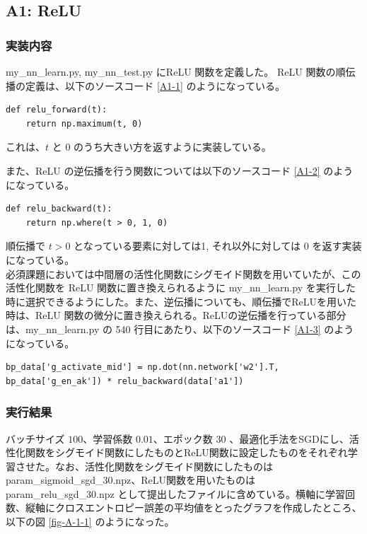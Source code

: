 \documentclass[a4paper,dvipdfmx]{jsarticle}
\begin{document}
\subsection*{A1: ReLU}

\subsubsection*{実装内容}

my\_nn\_learn.py, my\_nn\_test.py にReLU 関数を定義した。
ReLU 関数の順伝播の定義は、以下のソースコード \ref{A1-1} のようになっている。

\begin{lstlisting}[caption="ReLU 関数(順伝播)",label=A1-1]
def relu_forward(t):
    return np.maximum(t, 0)
\end{lstlisting}

これは、$t$ と $0$ のうち大きい方を返すように実装している。

また、ReLU の逆伝播を行う関数については以下のソースコード \ref{A1-2} のようになっている。

\begin{lstlisting}[caption="ReLU 関数(逆伝播)",label=A1-2]
def relu_backward(t):
    return np.where(t > 0, 1, 0)
\end{lstlisting}

順伝播で $t > 0$ となっている要素に対しては1, それ以外に対しては 0 を返す実装になっている。\\

必須課題においては中間層の活性化関数にシグモイド関数を用いていたが、この活性化関数を ReLU 関数に置き換えられるように my\_nn\_learn.py を実行した時に選択できるようにした。また、逆伝播についても、順伝播でReLUを用いた時は、ReLU 関数の微分に置き換えられる。ReLUの逆伝播を行っている部分は、my\_nn\_learn.py の 540 行目にあたり、以下のソースコード \ref{A1-3} のようになっている。

\begin{lstlisting}[caption="ReLU の逆伝播 を行う部分",label=A1-3]
bp_data['g_activate_mid'] = np.dot(nn.network['w2'].T, bp_data['g_en_ak']) * relu_backward(data['a1'])
\end{lstlisting}

\subsubsection*{実行結果}

バッチサイズ $100$、学習係数 $0.01$、エポック数 $30$ 、最適化手法をSGDにし、活性化関数をシグモイド関数にしたものとReLU関数に設定したものをそれぞれ学習させた。なお、活性化関数をシグモイド関数にしたものは param\_sigmoid\_sgd\_30.npz、ReLU関数を用いたものは param\_relu\_sgd\_30.npz として提出したファイルに含めている。横軸に学習回数、縦軸にクロスエントロピー誤差の平均値をとったグラフを作成したところ、以下の図 \ref{fig-A-1-1} のようになった。
\end{document}
